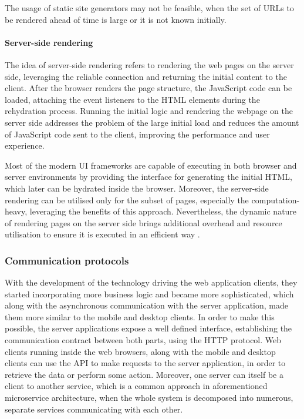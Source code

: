 The usage of static site generators may not be feasible, when the set of URLs to be rendered ahead of time is large or it is not known initially.

\paragraph{Server-side rendering}

The idea of server-side rendering refers to rendering the web pages on the server side, leveraging the reliable connection and returning the initial content to the client. After the browser renders the page structure, the JavaScript code can be loaded, attaching the event listeners to the HTML elements during the rehydration process. Running the initial logic and rendering the webpage on the server side addresses the problem of the large initial load and reduces the amount of JavaScript code sent to the client, improving the performance and user experience.

Most of the modern UI frameworks are capable of executing in both browser and server environments by providing the interface for generating the initial HTML, which later can be hydrated inside the browser. Moreover, the server-side rendering can be utilised only for the subset of pages, especially the computation-heavy, leveraging the benefits of this approach. Nevertheless, the dynamic nature of rendering pages on the server side brings additional overhead and resource utilisation to ensure it is executed in an efficient way \cite{GoogleRenderingOnTheWeb}.

\subsubsection{Communication protocols} \label{chapter:communication-protocols}

With the development of the technology driving the web application clients, they started incorporating more business logic and became more sophisticated, which along with the asynchronous communication with the server application, made them more similar to the mobile and desktop clients. In order to make this possible, the server applications expose a well defined interface, establishing the communication contract between both parts, using the HTTP protocol. Web clients running inside the web browsers, along with the mobile and desktop clients can use the API to make requests to the server application, in order to retrieve the data or perform some action. Moreover, one server can itself be a client to another service, which is a common approach in aforementioned microservice architecture, when the whole system is decomposed into numerous, separate services communicating with each other.


